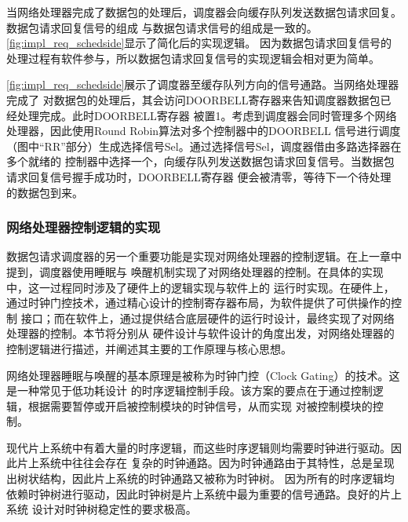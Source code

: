 当网络处理器完成了数据包的处理后，调度器会向缓存队列发送数据包请求回复。数据包请求回复信号的组成
与数据包请求信号的组成是一致的。\autoref{fig:impl_req_schedside}显示了简化后的实现逻辑。
因为数据包请求回复信号的处理过程有软件参与，所以数据包请求回复信号的实现逻辑会相对更为简单。


\autoref{fig:impl_req_schedside}展示了调度器至缓存队列方向的信号通路。当网络处理器完成了
对数据包的处理后，其会访问DOORBELL寄存器来告知调度器数据包已经处理完成。此时DOORBELL寄存器
被置1。考虑到调度器会同时管理多个网络处理器，因此使用Round Robin算法对多个控制器中的DOORBELL
信号进行调度（图中“RR”部分）生成选择信号Sel。通过选择信号Sel，调度器借由多路选择器在多个就绪的
控制器中选择一个，向缓存队列发送数据包请求回复信号。当数据包请求回复信号握手成功时，DOORBELL寄存器
便会被清零，等待下一个待处理的数据包到来。

\subsubsection{网络处理器控制逻辑的实现}


数据包请求调度器的另一个重要功能是实现对网络处理器的控制逻辑。在上一章中提到，调度器使用睡眠与
唤醒机制实现了对网络处理器的控制。在具体的实现中，这一过程同时涉及了硬件上的逻辑实现与软件上的
运行时实现。在硬件上，通过时钟门控技术，通过精心设计的控制寄存器布局，为软件提供了可供操作的控制
接口；而在软件上，通过提供结合底层硬件的运行时设计，最终实现了对网络处理器的控制。本节将分别从
硬件设计与软件设计的角度出发，对网络处理器的控制逻辑进行描述，并阐述其主要的工作原理与核心思想。


网络处理器睡眠与唤醒的基本原理是被称为时钟门控（Clock Gating）的技术。这是一种常见于低功耗设计
的时序逻辑控制手段。该方案的要点在于通过控制逻辑，根据需要暂停或开启被控制模块的时钟信号，从而实现
对被控制模块的控制。

现代片上系统中有着大量的时序逻辑，而这些时序逻辑则均需要时钟进行驱动。因此片上系统中往往会存在
复杂的时钟通路。因为时钟通路由于其特性，总是呈现出树状结构，因此片上系统的时钟通路又被称为时钟树。
因为所有的时序逻辑均依赖时钟树进行驱动，因此时钟树是片上系统中最为重要的信号通路。良好的片上系统
设计对时钟树稳定性的要求极高。

